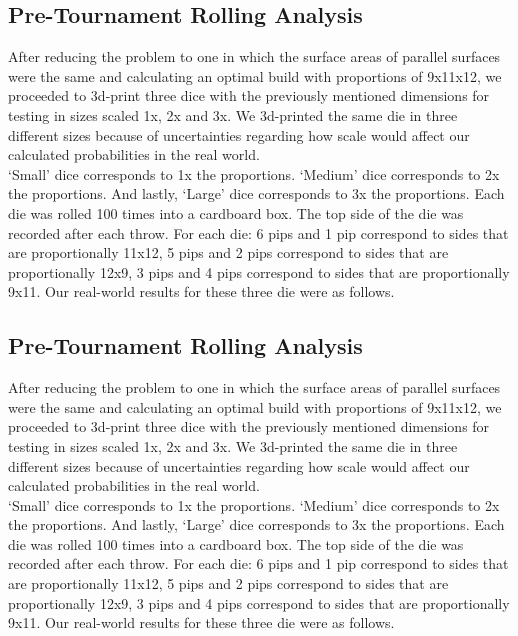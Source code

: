 \subsection{Pre-Tournament Rolling Analysis}
After reducing the problem to one in which the surface areas of parallel surfaces were the same and calculating an optimal build with proportions of 9x11x12, we proceeded to 3d-print three dice with the previously mentioned dimensions for testing in sizes scaled 1x, 2x and 3x. We 3d-printed the same die in three different sizes because of uncertainties regarding how scale would affect our calculated probabilities in the real world.\\
‘Small’ dice corresponds to 1x the proportions. ‘Medium’ dice corresponds to 2x the proportions. And lastly, ‘Large’ dice corresponds to 3x the proportions. Each die was rolled 100 times into a cardboard box. The top side of the die was recorded after each throw. For each die: 6 pips and 1 pip correspond to sides that are proportionally 11x12, 5 pips and 2 pips correspond to sides that are proportionally 12x9, 3 pips and 4 pips correspond to sides that are proportionally 9x11. Our real-world results for these three die were as follows.\\

\subsection{Pre-Tournament Rolling Analysis}
After reducing the problem to one in which the surface areas of parallel surfaces were the same and calculating an optimal build with proportions of 9x11x12, we proceeded to 3d-print three dice with the previously mentioned dimensions for testing in sizes scaled 1x, 2x and 3x. We 3d-printed the same die in three different sizes because of uncertainties regarding how scale would affect our calculated probabilities in the real world.\\
‘Small’ dice corresponds to 1x the proportions. ‘Medium’ dice corresponds to 2x the proportions. And lastly, ‘Large’ dice corresponds to 3x the proportions. Each die was rolled 100 times into a cardboard box. The top side of the die was recorded after each throw. For each die: 6 pips and 1 pip correspond to sides that are proportionally 11x12, 5 pips and 2 pips correspond to sides that are proportionally 12x9, 3 pips and 4 pips correspond to sides that are proportionally 9x11. Our real-world results for these three die were as follows.\\

